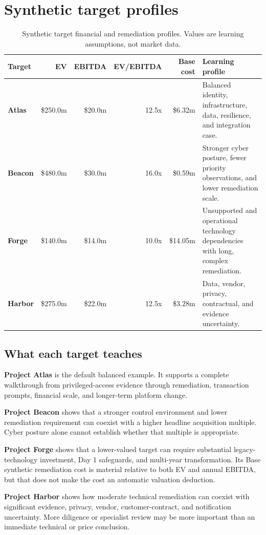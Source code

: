 \documentclass[11pt,a4paper]{article}
\begin{document}
\section{Synthetic target profiles}

\begin{table}[ht]
\centering
\small
\begin{tabularx}{\textwidth}{>{\bfseries}l r r r r X}
\toprule
Target & EV & EBITDA & EV/EBITDA & Base cost & Learning profile \\
\midrule
Atlas & \$250.0m & \$20.0m & 12.5x & \$6.32m & Balanced identity, infrastructure, data, resilience, and integration case. \\
Beacon & \$480.0m & \$30.0m & 16.0x & \$0.59m & Stronger cyber posture, fewer priority observations, and lower remediation scale. \\
Forge & \$140.0m & \$14.0m & 10.0x & \$14.05m & Unsupported and operational technology dependencies with long, complex remediation. \\
Harbor & \$275.0m & \$22.0m & 12.5x & \$3.28m & Data, vendor, privacy, contractual, and evidence uncertainty. \\
\bottomrule
\end{tabularx}
\caption{Synthetic target financial and remediation profiles. Values are learning assumptions, not market data.}
\end{table}

\subsection{What each target teaches}

\textbf{Project Atlas} is the default balanced example. It supports a complete walkthrough from privileged-access evidence through remediation, transaction prompts, financial scale, and longer-term platform change.

\textbf{Project Beacon} shows that a stronger control environment and lower remediation requirement can coexist with a higher headline acquisition multiple. Cyber posture alone cannot establish whether that multiple is appropriate.

\textbf{Project Forge} shows that a lower-valued target can require substantial legacy-technology investment, Day 1 safeguards, and multi-year transformation. Its Base synthetic remediation cost is material relative to both EV and annual EBITDA, but that does not make the cost an automatic valuation deduction.

\textbf{Project Harbor} shows how moderate technical remediation can coexist with significant evidence, privacy, vendor, customer-contract, and notification uncertainty. More diligence or specialist review may be more important than an immediate technical or price conclusion.
\end{document}
